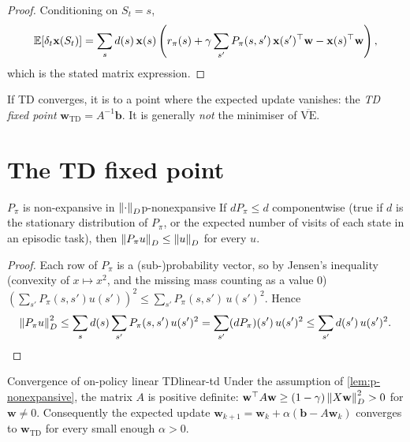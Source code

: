 \begin{proof}
  Conditioning on $S_t = s$,
  \begin{equation*}
    \mathbb{E}[\delta_t \mathbf{x}(S_t)] = \sum_s d(s)\, \mathbf{x}(s) \left(
    r_\pi(s) + \gamma \sum_{s'} P_\pi(s, s')\, \mathbf{x}(s')^\top
    \mathbf{w} - \mathbf{x}(s)^\top \mathbf{w} \right),
  \end{equation*}
  which is the stated matrix expression.
\end{proof}

If TD converges, it is to a point where the expected update vanishes: the
\emph{TD fixed point} $\mathbf{w}_{\mathrm{TD}} = A^{-1} \mathbf{b}$. It is
generally \emph{not} the minimiser of $\overline{\mathrm{VE}}$.

\section{The TD fixed point}

\begin{lemma}{$P_\pi$ is non-expansive in $\left\lVert \cdot \right\rVert_D$}{p-nonexpansive}
  If $d P_\pi \leq d$ componentwise (true if $d$ is the stationary
  distribution of $P_\pi$, or the expected number of visits of each state
  in an episodic task), then $\left\lVert P_\pi u \right\rVert_D \leq \left\lVert u \right\rVert_D$ for every
  $u$.
\end{lemma}

\begin{proof}
  Each row of $P_\pi$ is a (sub-)probability vector, so by Jensen's
  inequality (convexity of $x \mapsto x^2$, and the missing mass counting
  as a value $0$) $\left( \sum_{s'} P_\pi(s, s') u(s') \right)^2 \leq
  \sum_{s'} P_\pi(s, s')\, u(s')^2$. Hence
  \begin{equation*}
    \left\lVert P_\pi u \right\rVert_D^2 \leq \sum_s d(s) \sum_{s'} P_\pi(s, s')\, u(s')^2 =
    \sum_{s'} (d P_\pi)(s')\, u(s')^2 \leq \sum_{s'} d(s')\, u(s')^2.
    \qedhere
  \end{equation*}
\end{proof}

\begin{theorem}{Convergence of on-policy linear TD}{linear-td}
  Under the assumption of \cref{lem:p-nonexpansive}, the matrix $A$ is
  positive definite: $\mathbf{w}^\top A \mathbf{w} \geq (1 - \gamma)
  \left\lVert X \mathbf{w} \right\rVert_D^2 > 0$ for $\mathbf{w} \neq 0$. Consequently the
  expected update $\mathbf{w}_{k+1} = \mathbf{w}_k + \alpha (\mathbf{b} - A
  \mathbf{w}_k)$ converges to $\mathbf{w}_{\mathrm{TD}}$ for every small
  enough $\alpha > 0$.
\end{theorem}

